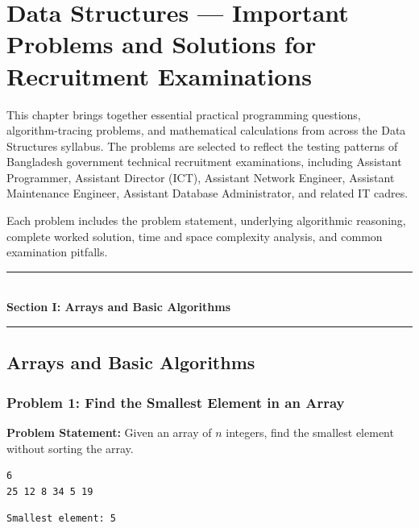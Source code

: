 \chapter{Data Structures --- Important Problems and Solutions for Recruitment Examinations}
\label{ch:data_structures_problems}

This chapter brings together essential practical programming questions, algorithm-tracing problems, and mathematical calculations from across the Data Structures syllabus. The problems are selected to reflect the testing patterns of Bangladesh government technical recruitment examinations, including Assistant Programmer, Assistant Director (ICT), Assistant Network Engineer, Assistant Maintenance Engineer, Assistant Database Administrator, and related IT cadres.

Each problem includes the problem statement, underlying algorithmic reasoning, complete worked solution, time and space complexity analysis, and common examination pitfalls.

\begin{center}
\vspace{0.5em}
{\color{primary}\rule{0.45\textwidth}{1.2pt}}\\[4pt]
{\Large\bfseries\color{primary} Section I: Arrays and Basic Algorithms}\\[2pt]
{\color{primary}\rule{0.45\textwidth}{1.2pt}}
\vspace{0.5em}
\end{center}

\section{Arrays and Basic Algorithms}

\subsection{Problem 1: Find the Smallest Element in an Array}

\textbf{Problem Statement:} Given an array of $n$ integers, find the smallest element without sorting the array.

\begin{lstlisting}[style=pseudocode, caption={Input}]
6
25 12 8 34 5 19
\end{lstlisting}

\begin{lstlisting}[style=pseudocode, caption={Expected Output}]
Smallest element: 5
\end{lstlisting}

